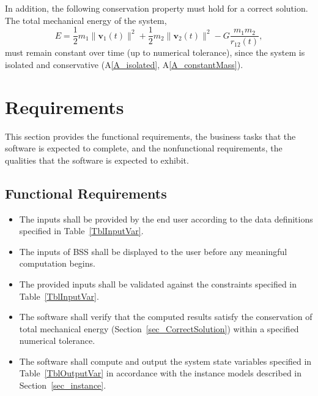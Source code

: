 \documentclass[12pt]{article}
\newcommand{\aref}[1]{A\ref{#1}}
\newcounter{reqnum} %
\begin{document}
\noindent In addition, the following conservation property must hold for a correct
solution. The total mechanical energy of the system,
\begin{equation*}
E = \frac{1}{2}m_1\lVert\mathbf{v}_1(t)\rVert^2
  + \frac{1}{2}m_2\lVert\mathbf{v}_2(t)\rVert^2
  - G\frac{m_1 m_2}{r_{12}(t)},
\end{equation*}
must remain constant over time (up to numerical tolerance), since the system is
isolated and conservative (\aref{A_isolated}, \aref{A_constantMass}).

\section{Requirements}


This section provides the functional requirements, the business tasks that the
software is expected to complete, and the nonfunctional requirements, the
qualities that the software is expected to exhibit.

\subsection{Functional Requirements}

\noindent \begin{itemize}

\item[R\refstepcounter{reqnum}\thereqnum \label{R_Inputs}:] The inputs shall be
  provided by the end user according to the data definitions
specified in Table~\ref{TblInputVar}.

\item[R\refstepcounter{reqnum}\thereqnum \label{R_OutputInputs}:] The inputs of
  BSS shall be displayed to the user before any meaningful
computation begins.

\item[R\refstepcounter{reqnum}\thereqnum \label{R_Calculate}:] The provided
  inputs shall be validated against the constraints specified in
Table~\ref{TblInputVar}.

\item[R\refstepcounter{reqnum}\thereqnum \label{R_VerifyOutput}:]
The software shall verify that the computed results satisfy the conservation of
total mechanical energy (Section~\ref{sec_CorrectSolution}) within a specified
numerical tolerance.

\item[R\refstepcounter{reqnum}\thereqnum \label{R_Output}:]
The software shall compute and output the system state variables specified in
Table~\ref{TblOutputVar} in accordance with the instance models described in
Section~\ref{sec_instance}.


\end{itemize}
\end{document}
